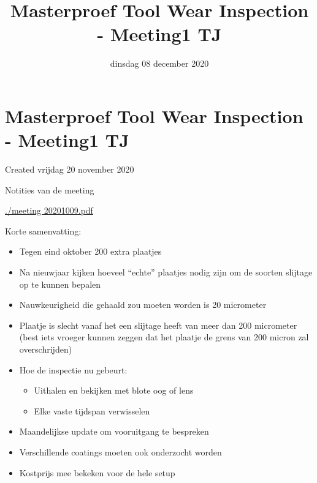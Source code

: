 \documentclass{scrartcl}
\title{Masterproef Tool Wear Inspection - Meeting1 TJ}
\date{dinsdag 08 december 2020}
\author{}
\begin{document}
\maketitle

		\section{Masterproef Tool Wear Inspection - Meeting1 TJ}

Created vrijdag 20 november 2020



Notities van de meeting

\href{./Masterproef_Tool_Wear_Inspection_-_Meeting1_TJ/meeting%2020201009.pdf}{./meeting 20201009.pdf}



Korte samenvatting:

\begin{itemize}
\item Tegen eind oktober 200 extra plaatjes
\item Na nieuwjaar kijken hoeveel “echte” plaatjes nodig zijn om de soorten slijtage op te kunnen bepalen
\item Nauwkeurigheid die gehaald zou moeten worden is 20 micrometer
\item Plaatje is slecht vanaf het een slijtage heeft van meer dan 200 micrometer (best iets vroeger kunnen zeggen dat het plaatje de grens van 200 micron zal overschrijden)
\item Hoe de inspectie nu gebeurt:
	\begin{itemize}
	\item Uithalen en bekijken met blote oog of lens
	\item Elke vaste tijdspan verwisselen
	\end{itemize}
\item Maandelijkse update om vooruitgang te bespreken
\item Verschillende coatings moeten ook onderzocht worden
\item Kostprijs mee bekeken voor de hele setup
\end{itemize}
\end{document}
